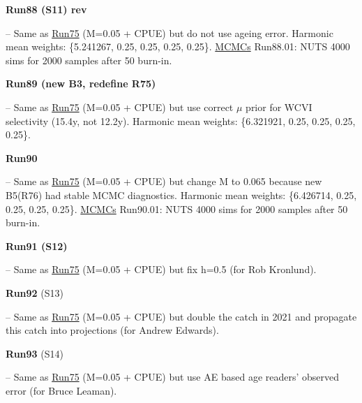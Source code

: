 \hypertarget{R88}{\textbf{Run88 (S11) rev}} -- Same as \hyperlink{R75}{Run75} (M=0.05 + CPUE) but do not use ageing error. Harmonic mean weights: \{5.241267, 0.25, 0.25, 0.25, 0.25\}.  \underline{MCMCs} Run88.01: NUTS 4000 sims for 2000 samples after 50\pc{} burn-in.

\hypertarget{R89}{\textbf{Run89 (new B3, redefine R75)}} -- Same as \hyperlink{R75}{Run75} (M=0.05 + CPUE) but use correct $\mu$ prior for WCVI selectivity (15.4y, not 12.2y). Harmonic mean weights: \{6.321921, 0.25, 0.25, 0.25, 0.25\}. 

\hypertarget{R90}{\textbf{Run90}} -- Same as \hyperlink{R75}{Run75} (M=0.05 + CPUE) but change M to 0.065 because new B5(R76) had stable MCMC diagnostics. Harmonic mean weights: \{6.426714, 0.25, 0.25, 0.25, 0.25\}.  \underline{MCMCs} Run90.01: NUTS 4000 sims for 2000 samples after 50\pc{} burn-in.

\hypertarget{R91}{\textbf{Run91 (S12)}} -- Same as \hyperlink{R75}{Run75} (M=0.05 + CPUE) but fix h=0.5 (for Rob Kronlund).

\hypertarget{R92}{\textbf{Run92} (S13)} -- Same as \hyperlink{R75}{Run75} (M=0.05 + CPUE) but double the catch in 2021 and propagate this catch into projections (for Andrew Edwards).

\hypertarget{R93}{\textbf{Run93} (S14)} -- Same as \hyperlink{R75}{Run75} (M=0.05 + CPUE) but use AE based age readers' observed error (for Bruce Leaman).



